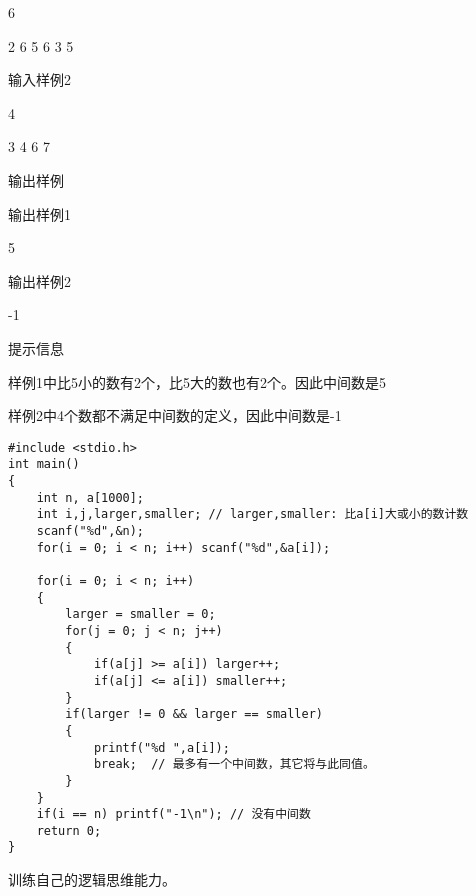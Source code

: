 6 

2 6 5 6 3 5 

输入样例2 

4 

3 4 6 7 

输出样例

输出样例1 

5 

输出样例2 

-1

提示信息

样例1中比5小的数有2个，比5大的数也有2个。因此中间数是5 

样例2中4个数都不满足中间数的定义，因此中间数是-1

\begin{lstlisting}
#include <stdio.h>
int main()
{
	int n, a[1000];
	int i,j,larger,smaller;	// larger,smaller: 比a[i]大或小的数计数
	scanf("%d",&n);
	for(i = 0; i < n; i++) scanf("%d",&a[i]);
	
	for(i = 0; i < n; i++)
	{
		larger = smaller = 0;
		for(j = 0; j < n; j++)
		{
			if(a[j] >= a[i]) larger++; 
			if(a[j] <= a[i]) smaller++;
		}
		if(larger != 0 && larger == smaller) 
		{
			printf("%d ",a[i]); 
			break;  // 最多有一个中间数，其它将与此同值。 
		}
	}
	if(i == n) printf("-1\n"); // 没有中间数 
	return 0;
}
\end{lstlisting}

\begin{note}[要点]
	训练自己的逻辑思维能力。
\end{note}



